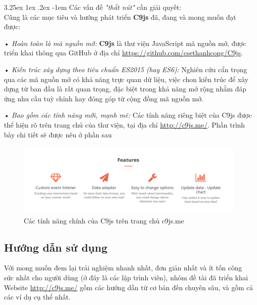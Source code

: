 \documentclass[12pt,a4paper]{article}
\makeatletter
\newcommand{\myparagraph}[1]{\paragraph{#1}\mbox{}\\} %
\renewcommand\paragraph{\@startsection{paragraph}{5}{\z@}%
  {3.25ex \@plus1ex \@minus.2ex}%
  {-1em}%
  {\normalfont\normalsize\bfseries}}
\makeatother
\begin{document}
\myparagraph{Các vấn đề \textit{"thắt nút"} cần giải quyết:}
Cũng là các mục tiêu và hướng phát triển \textbf{C9js} đã, đang và mong muốn đạt được: 
\begin{list}{}{}
\item[•] \emph{Hoàn toàn là mã nguồn mở:} \textbf{C9js} là thư viện JavaScript mã nguồn mở, được triển khai thông qua GitHub ở địa chỉ \url{https://github.com/csethanhcong/C9js}.

\item[•] \emph{Kiến trúc xây dựng theo tiêu chuẩn ES2015 (hay ES6):} Nghiên cứu cẩn trọng qua các mã nguồn mở có khả năng trực quan dữ liệu, việc chon kiến trúc để xây dựng từ ban đầu là rất quan trọng, đặc biệt trong khả năng mở rộng nhằm đáp ứng nhu cầu tuỳ chỉnh hay đóng góp từ cộng đồng mã nguồn mở.

\item[•] \emph{Bao gồm các tính năng mới, mạnh mẽ:}
Các tính năng riêng biệt của C9js được thể hiện rõ trên trang chủ của thư viện, tại địa chỉ \url{http://c9js.me/}. Phần trình bày chi tiết sẽ được nêu ở phần sau

\begin{figure}[htp]
	\begin{center}
    \includegraphics[scale=.5]{image/c9js_feature}
    \caption{Các tính năng chính của C9js trên trang chủ c9js.me}
    \label{fig:c9js_feature}
	\end{center}
\end{figure}

\end{list}

\subsection{Hướng dẫn sử dụng}
Với mong muốn đem lại trải nghiệm nhanh nhất, đơn giản nhất và ít tốn công sức nhất cho người dùng (ở đây là các lập trình viên), nhóm đề tài đã triển khai Website \url{http://c9js.me/} gồm các hướng dẫn từ cơ bản đến chuyên sâu, và gồm cả các ví dụ cụ thể nhất. 
\end{document}
